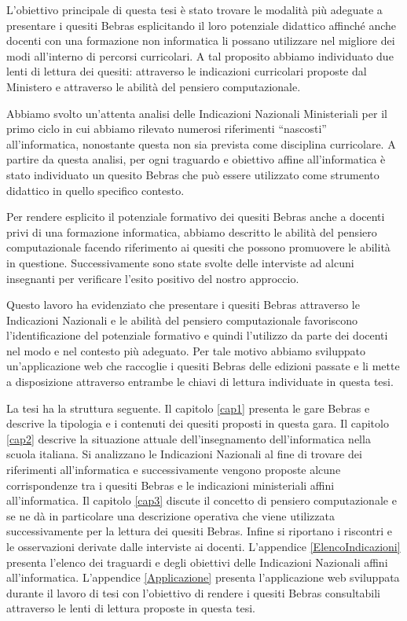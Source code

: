 \documentclass[12pt]{report}
\begin{document}
L'obiettivo principale di questa tesi è stato trovare le modalità più adeguate a presentare i quesiti Bebras esplicitando il loro potenziale didattico affinché anche docenti con una formazione non informatica li possano utilizzare nel migliore dei modi all'interno di percorsi curricolari.
A tal proposito abbiamo individuato due lenti di lettura dei quesiti: attraverso le indicazioni curricolari proposte dal Ministero e attraverso le abilità del pensiero computazionale.

Abbiamo svolto un'attenta analisi delle Indicazioni Nazionali Ministeriali per il primo ciclo in cui abbiamo rilevato numerosi riferimenti ``nascosti'' all'informatica, nonostante questa non sia prevista come disciplina curricolare. A partire da questa analisi, per ogni traguardo e obiettivo affine all'informatica è stato individuato un quesito Bebras che può essere utilizzato come strumento didattico in quello specifico contesto.

Per rendere esplicito il potenziale formativo dei quesiti Bebras anche a docenti privi di una formazione informatica, abbiamo descritto le abilità del pensiero computazionale facendo riferimento ai quesiti che possono promuovere le abilità in questione.
Successivamente sono state svolte delle interviste ad alcuni insegnanti per verificare l'esito positivo del nostro approccio.

Questo lavoro ha evidenziato che presentare i quesiti Bebras attraverso le Indicazioni Nazionali e le abilità del pensiero computazionale favoriscono l'identificazione del potenziale formativo e quindi l'utilizzo da parte dei docenti nel modo e nel contesto più adeguato.
Per tale motivo abbiamo sviluppato un'applicazione web che raccoglie i quesiti Bebras delle edizioni passate e li mette a disposizione attraverso entrambe le chiavi di lettura individuate in questa tesi.


La tesi ha la struttura seguente. Il capitolo \ref{cap1} presenta le gare Bebras e descrive la tipologia e i contenuti dei quesiti proposti in questa gara.
Il capitolo \ref{cap2} descrive la situazione attuale dell'insegnamento dell'informatica nella scuola italiana. Si analizzano le Indicazioni Nazionali al fine di trovare dei riferimenti all'informatica e successivamente vengono proposte alcune corrispondenze tra i quesiti Bebras e le indicazioni ministeriali affini all'informatica.
Il capitolo \ref{cap3} discute il concetto di pensiero computazionale e se ne dà in particolare una descrizione operativa che viene utilizzata successivamente per la lettura dei quesiti Bebras. Infine si riportano i riscontri e le osservazioni derivate dalle interviste ai docenti.
L'appendice \ref{ElencoIndicazioni} presenta l'elenco dei traguardi e degli obiettivi delle Indicazioni Nazionali affini all'informatica.
L'appendice \ref{Applicazione} presenta l'applicazione web sviluppata durante il lavoro di tesi con l'obiettivo di rendere i quesiti Bebras consultabili attraverso le lenti di lettura proposte in questa tesi.
%
%
% 
% 
\end{document}
